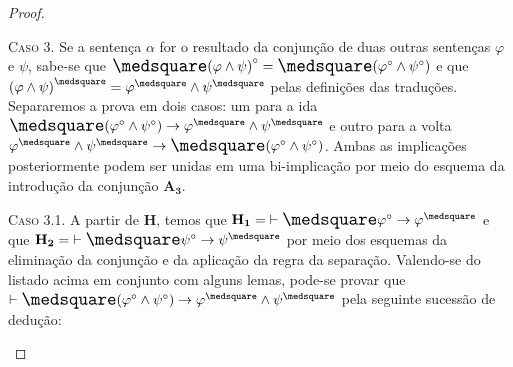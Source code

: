 \begin{theorem}
\begin{proof}
        \begin{case}
            \textsc{Caso 3.}
            Se a sentença $\alpha$ for o resultado da conjunção de duas outras sentenças $\varphi$ e $\psi$, sabe-se que $\nec{(\varphi\wedge\psi)}^\circ=\nec(\varphi^\circ\wedge\psi^\circ)$ e que ${(\varphi\wedge\psi)}^\medsquare=\varphi^\medsquare\wedge\psi^\medsquare$ pelas definições das traduções.
            Separaremos a prova em dois casos: um para a ida $\nec(\varphi^\circ\wedge\psi^\circ)\to\varphi^\medsquare\wedge\psi^\medsquare$ e outro para a volta $\varphi^\medsquare\wedge\psi^\medsquare\to\nec(\varphi^\circ\wedge\psi^\circ)$. Ambas as implicações posteriormente podem ser unidas em uma bi-implicação por meio do esquema da introdução da conjunção \hyperref[MA3]{$\mathbf{A_3}$}.
        \end{case}

            \begin{subcase}
                \textsc{Caso 3.1.}
                A partir de $\mathbf{H}$, temos que $\mathbf{H_1}={\entails\nec\varphi^\circ\to\varphi^\medsquare}$ e que $\mathbf{H_2}={\entails\nec\psi^\circ\to\psi^\medsquare}$ por meio dos esquemas da eliminação da conjunção e da aplicação da regra da separação.
                Valendo-se do listado acima em conjunto com alguns lemas, pode-se provar que $\entails\nec(\varphi^\circ\wedge\psi^\circ)\to\varphi^\medsquare\wedge\psi^\medsquare$ pela seguinte sucessão de dedução:


\end{subcase}
\end{proof}
\end{theorem}
